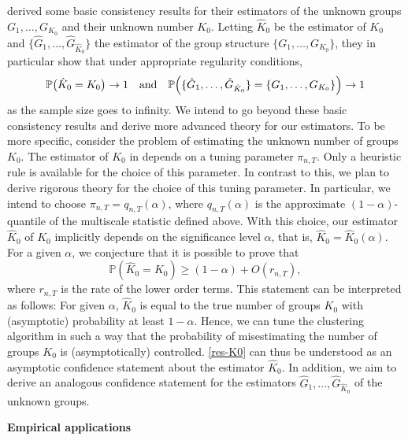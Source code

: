 \documentclass[a4paper,12pt]{article}
\begin{document}
\cite{VogtLinton2018} derived some basic consistency results for their estimators of the unknown groups $G_1,\ldots,G_{K_0}$ and their unknown number $K_0$. Letting $\hat{K}_0$ be the estimator of $K_0$ and $\{ \hat{G}_1,\ldots,\hat{G}_{\hat{K}_0} \}$ the estimator of the group structure $\{ G_1,\ldots,G_{K_0} \}$, they in particular show that under appropriate regularity conditions, 
\begin{equation}\label{consistency-res-VogtLinton2018}
\mathbb{P} \big( \hat{K}_0 = K_0 \big) \rightarrow 1 \quad \text{and} \quad \mathbb{P} \Big( \{ \hat{G}_1,\ldots,\hat{G}_{\hat{K}_0} \} = \{ G_1,\ldots,G_{K_0} \} \Big) \rightarrow 1 
\end{equation}
as the sample size goes to infinity. We intend to go beyond these basic consistency results and derive more advanced theory for our estimators. To be more specific, consider the problem of estimating the unknown number of groups $K_0$.  The estimator of $K_0$ in \cite{VogtLinton2018} depends on a tuning parameter $\pi_{n,T}$. Only a heuristic rule is available for the choice of this parameter. In contrast to this, we plan to derive rigorous theory for the choice of this tuning parameter. In particular, we intend to choose $\pi_{n,T} = q_{n,T}(\alpha)$, where $q_{n,T}(\alpha)$ is the approximate $(1-\alpha)$-quantile of the multiscale statistic defined above. With this choice, our estimator $\hat{K}_0$ of $K_0$ implicitly depends on the significance level $\alpha$, that is, $\hat{K}_0 = \hat{K}_0(\alpha)$. For a given $\alpha$, we conjecture that it is possible to prove that  
\begin{equation}\label{res-K0}
\mathbb{P}( \hat{K}_0 = K_0 ) \ge (1-\alpha) + O(r_{n,T}), 
\end{equation}
where $r_{n,T}$ is the rate of the lower order terms. This statement can be interpreted as follows: For given $\alpha$, $\hat{K}_0$ is equal to the true number of groups $K_0$ with (asymptotic) probability at least $1-\alpha$. Hence, we can tune the clustering algorithm in such a way that the probability of misestimating the number of groups $K_0$ is (asymptotically) controlled. \eqref{res-K0} can thus be understood as an asymptotic confidence statement about the estimator $\hat{K}_0$. In addition, we aim to derive an analogous confidence statement for the estimators $\hat{G}_1,\ldots,\hat{G}_{\hat{K}_0}$ of the unknown groups.
\vspace{10pt}


\noindent \textbf{Empirical applications} 
\vspace{10pt}
\end{document}
